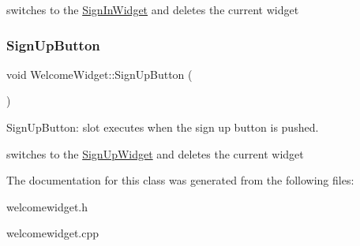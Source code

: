 switches to the \hyperlink{classSignInWidget}{Sign\+In\+Widget} and deletes the current widget \mbox{\label{classWelcomeWidget_a3c90bf38f03e2892d4a990ba3cdcf958}} 
\subsubsection{\texorpdfstring{Sign\+Up\+Button}{SignUpButton}}
{\footnotesize\ttfamily void Welcome\+Widget\+::\+Sign\+Up\+Button (\begin{DoxyParamCaption}{ }\end{DoxyParamCaption})\hspace{0.3cm}{\ttfamily [slot]}}



Sign\+Up\+Button\+: slot executes when the sign up button is pushed. 

switches to the \hyperlink{classSignUpWidget}{Sign\+Up\+Widget} and deletes the current widget 

The documentation for this class was generated from the following files\+:\begin{DoxyCompactItemize}
\item 
welcomewidget.\+h\item 
welcomewidget.\+cpp\end{DoxyCompactItemize}
